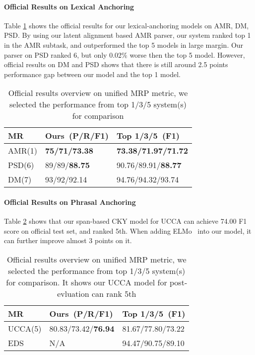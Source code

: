 \paragraph{Official Results on Lexical Anchoring}
Table \ref{tbl:results_rank} shows the official results for our
lexical-anchoring models on AMR, DM, PSD.  By using our latent
alignment based AMR parser, our system ranked top 1 in the AMR subtask,
and outperformed the top 5 models in large margin. Our parser on PSD
ranked 6, but only 0.02\% worse then the top 5 model. However, official
results on DM and PSD shows that there is still around 2.5 points
performance gap between our model and the top 1 model.

\begin{table}[!h]
\small
\centering
\begin{tabular}{lll}
\toprule
MR     & Ours~(P/R/F1) & Top 1/3/5~(F1)  \\ \hline
AMR(1) & {\bf 75/71/73.38}   & {\bf 73.38/71.97/71.72} \\
PSD(6) & 89/89/{\bf 88.75}   & 90.76/89.91/{\bf 88.77} \\
DM(7)  & 93/92/92.14   & 94.76/94.32/93.74 \\ \hline
\end{tabular}
\caption{\label{tbl:results_rank} Official results overview on unified MRP metric, we selected the performance from top 1/3/5 system(s) for comparison}
\end{table}

\paragraph{Official Results on Phrasal Anchoring} Table
\ref{tbl:ucca_results_rank} shows that our span-based CKY model for
UCCA can achieve 74.00 F1 score on official test set, and ranked
5th. When adding ELMo~\cite{peters2018deep} into our model, it can further improve almost 3
points on it.
\begin{table}[!h]
  \small
\centering
\begin{tabular}{lll}
\toprule
MR     & Ours~(P/R/F1) & Top 1/3/5~(F1)  \\ \hline
UCCA(5)   & 80.83/73.42/\textbf{76.94}   & 81.67/77.80/73.22 \\
EDS    & N/A                 & 94.47/90.75/89.10 \\ \bottomrule
\end{tabular}
\caption{\label{tbl:ucca_results_rank} Official results overview on
  unified MRP metric, we selected the performance from top 1/3/5
  system(s) for comparison. It shows our UCCA model for post-evluation
  can rank 5th}
\end{table}


